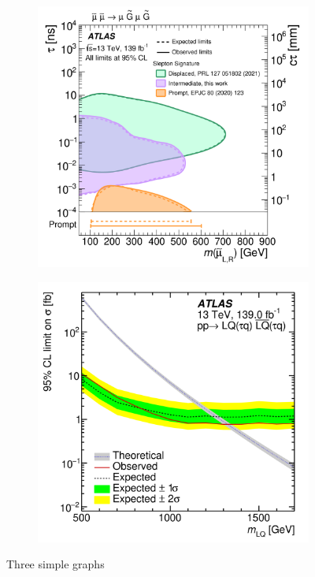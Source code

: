 \documentclass{moriond}
\begin{document}
\begin{figure}[htbp!]
\begin{subfigure}[b]{0.32\textwidth}
         \includegraphics[width=\textwidth]{micro}
         \caption{}
         \label{fig:rhn}
     \end{subfigure}
     \begin{subfigure}[b]{0.32\textwidth}
         \centering
         \includegraphics[width=\textwidth]{excited}
         \caption{}
         \label{fig:rhn}
     \end{subfigure}
        \caption{Three simple graphs}
        \label{fig:diagrams}
\end{figure}
\end{document}
